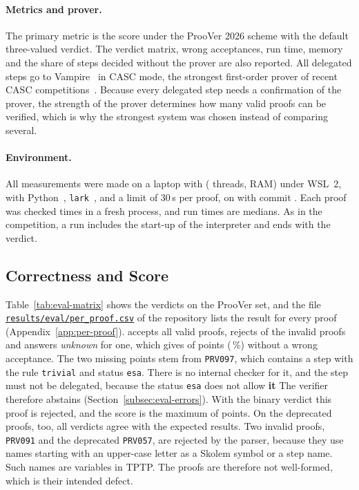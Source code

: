 \paragraph{Metrics and prover.}
The primary metric is the score under the ProoVer 2026 scheme with the default three-valued verdict. The verdict matrix, wrong acceptances, run time, memory and the share of steps decided without the prover are also reported.
All delegated steps go to Vampire~\citep{KovacsVoronkov2013} in CASC mode, the strongest first-order prover of recent CASC competitions~\citep{CASC30}.
Because every delegated step needs a confirmation of the prover, the strength of the prover determines how many valid proofs can be verified, which is why the strongest system was chosen instead of comparing several.

\paragraph{Environment.}
All measurements were made on a laptop with \EvalCPU{} (\EvalCores{} threads, \EvalRAM{} RAM) under WSL~2, with Python~\EvalPython{}, \texttt{lark}~\EvalLark{}, \EvalVampire and a limit of 30\,s per proof, on \EvalDate{} with commit \EvalCommit.
Each proof was checked \EvalReps{} times in a fresh process, and run times are medians.
As in the competition, a run includes the start-up of the interpreter and ends with the verdict.

\subsection{Correctness and Score}
\label{subsec:eval-correctness}

Table~\ref{tab:eval-matrix} shows the verdicts on the ProoVer set, and the file \href{https://github.com/AlexanderGiller/master-thesis-proover/blob/main/results/eval/per_proof.csv}{\texttt{results/eval/per\_proof.csv}} of the repository lists the result for every proof (Appendix~\ref{app:per-proof}).
\TSTPy{} accepts all \EvalOffAccValid{} valid proofs, rejects \EvalOffRejInvalid{} of the \EvalOffInvalid{} invalid proofs and answers \emph{unknown} for one, which gives \EvalOffScore{} of \EvalOffMaxScore{} points (\EvalOffScorePct\,\%) without a wrong acceptance.
The two missing points stem from \texttt{PRV097}, which contains a step with the rule \texttt{trivial} and status \texttt{esa}.
There is no internal checker for it, and the step must not be delegated, because the status \texttt{esa} does not allow \textbf{it} The verifier therefore abstains (Section~\ref{subsec:eval-errors}).
With the binary verdict this proof is rejected, and the score is the maximum of \EvalOffScoreBinary{} points.
On the deprecated proofs, too, all verdicts agree with the expected results.
Two invalid proofs, \texttt{PRV091} and the deprecated \texttt{PRV057}, are rejected by the parser, because they use names starting with an upper-case letter as a Skolem symbol or a step name. Such names are variables in TPTP. The proofs are therefore not well-formed, which is their intended defect.

